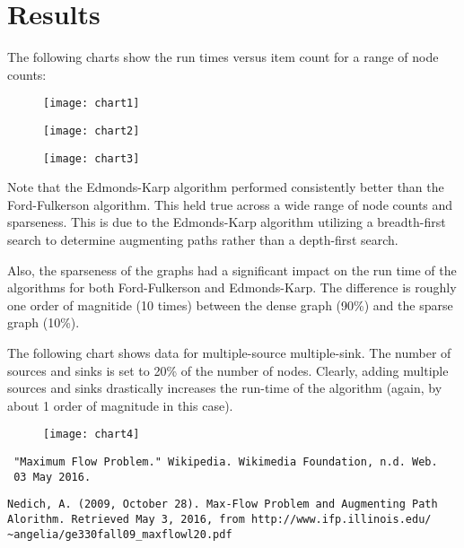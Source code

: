 \documentclass[12pt]{report}
\begin{document}
\section*{Results}
The following charts show the run times versus item count for a range of node counts:

\begin{figure}[ht!]
\begin{center}
\texttt{[image: chart1]}
\end{center}
\end{figure}

\begin{figure}[ht!]
\begin{center}
\texttt{[image: chart2]}
\end{center}
\end{figure}

\begin{figure}[ht!]
\begin{center}
\texttt{[image: chart3]}
\end{center}
\end{figure}

Note that the Edmonds-Karp algorithm performed consistently better than the Ford-Fulkerson algorithm. This held true across a wide range of node counts and sparseness. This is due to the Edmonds-Karp algorithm utilizing a breadth-first search to determine augmenting paths rather than a depth-first search.

Also, the sparseness of the graphs had a significant impact on the run time of the algorithms for both Ford-Fulkerson and Edmonds-Karp. The difference is roughly one order of magnitide (10 times) between the dense graph (90\%) and the sparse graph (10\%).

The following chart shows data for multiple-source multiple-sink. The number of sources and sinks is set to 20\% of the number of nodes. Clearly, adding multiple sources and sinks drastically increases the run-time of the algorithm (again, by about 1 order of magnitude in this case).

\begin{figure}[ht!]
\begin{center}
\texttt{[image: chart4]}
\end{center}
\end{figure}

\begin{thebibliography}{99}

\begin{verbatim}
 "Maximum Flow Problem." Wikipedia. Wikimedia Foundation, n.d. Web. 
 03 May 2016.  
\end{verbatim}

\begin{verbatim}
Nedich, A. (2009, October 28). Max-Flow Problem and Augmenting Path
Alorithm. Retrieved May 3, 2016, from http://www.ifp.illinois.edu/
~angelia/ge330fall09_maxflowl20.pdf
\end{verbatim}

\end{thebibliography}
\end{document}
